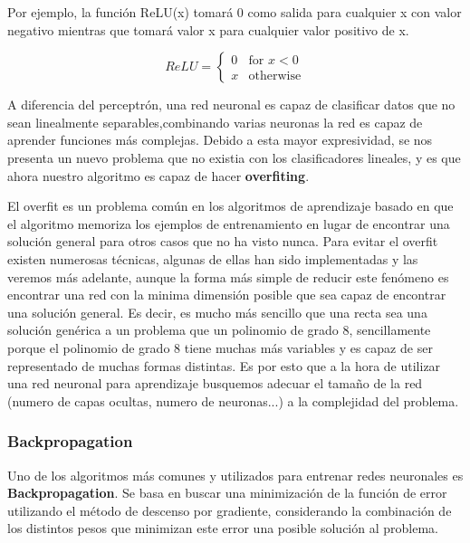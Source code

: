 Por ejemplo, la función ReLU(x) tomará 0 como salida para cualquier x con valor negativo mientras que tomará valor x para cualquier valor positivo de x.

\[
  ReLU =
  \begin{cases}
    0 & \text{for } x < 0 \\
    x & \text{otherwise}
  \end{cases}
\]

A diferencia del perceptrón, una red neuronal es capaz de clasificar datos que no sean linealmente separables,combinando varias neuronas la red es capaz de aprender funciones más complejas. Debido a esta mayor expresividad, se nos presenta un nuevo problema que no existia con los clasificadores lineales, y es que ahora nuestro algoritmo es capaz de hacer \textbf{overfiting}. 

El overfit es un problema común en los algoritmos de aprendizaje basado en que el algoritmo memoriza los ejemplos de entrenamiento en lugar de encontrar una solución general para otros casos que no ha visto nunca. Para evitar el overfit existen numerosas técnicas, algunas de ellas han sido implementadas y las veremos más adelante, aunque la forma más simple de reducir este fenómeno es encontrar una red con la minima dimensión posible que sea capaz de encontrar una solución general. Es decir, es mucho más sencillo que una recta sea una solución genérica a un problema que un polinomio de grado 8, sencillamente porque el polinomio de grado 8 tiene muchas más variables y es capaz de ser representado de muchas formas distintas. Es por esto que a la hora de utilizar una red neuronal para aprendizaje busquemos adecuar el tamaño de la red (numero de capas ocultas, numero de neuronas...) a la complejidad del problema.

\newpage
\subsubsection{Backpropagation}
\label{subsubsec:nn:backprop}

Uno de los algoritmos más comunes y utilizados para entrenar redes neuronales es \textbf{Backpropagation}. Se basa en buscar una minimización de la función de error utilizando el método de descenso por gradiente, considerando la combinación de los distintos pesos que minimizan este error una posible solución al problema.


